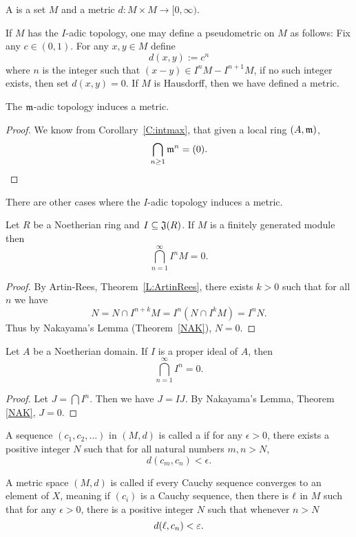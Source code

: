 \documentclass{ximera}
\begin{document}
\begin{definition}
  A  is a set $M$ and a metric $d:M\times M \to
  [0,\infty)$.
\end{definition}

If $M$ has the $I$-adic topology, one may define a
pseudometric on $M$ as follows: Fix any $c\in
(0,1)$. For any $x,y\in M$ define
\[
d(x,y) := c^n
\]
where $n$ is the integer such that $(x-y)\in I^nM-I^{n+1}M$, if no
such integer exists, then set $d(x,y) = 0$. If $M$ is
Hausdorff, then we have defined a metric.


\begin{corollary}
  The $\mathfrak{m}$-adic topology induces a metric.
  \begin{proof}
    We know from Corollary~\ref{C:intmax}, that given a local ring $(A,\mathfrak{m})$,
    \[
    \bigcap_{n\ge 1} \mathfrak{m}^n  = (0).
    \]
  \end{proof}
\end{corollary}

There are other cases where the $I$-adic topology induces a metric.

\begin{corollary}
  Let $R$ be a Noetherian ring and $I \subseteq \mathfrak J(R)$. If $M$ is a
  finitely generated module then
  \[
  \bigcap_{n=1}^\infty I^n M = 0.
  \]
  \begin{proof}
    By Artin-Rees, Theorem~\ref{L:ArtinRees}, there
    exists $k > 0$ such that for all $n$ we have
    \[
    N = N \cap I^{n + k}M = I^n(N \cap I^kM) = I^nN.
    \]
    Thus by Nakayama's Lemma
    (Theorem~\ref{NAK}), $N = 0$.
  \end{proof}
\end{corollary}


\begin{corollary}
  Let $A$ be a Noetherian domain. If $I$ is a proper ideal of $A$,
  then
  \[
  \bigcap_{n=1}^\infty I^n = 0.
  \]
  \begin{proof}
    Let $J = \bigcap I^n$.  Then we have $J = I J$.  By Nakayama's
    Lemma, Theorem \ref{NAK}, $J = 0$.
  \end{proof}
\end{corollary}









\begin{definition}
  A sequence $(c_1,c_2,\dots)$ in $(M,d)$ is called a  if for any $\epsilon>0$, there exists a positive integer
  $N$ such that for all natural numbers $m,n>N$,
  \[
  d(c_m,c_n) < \epsilon.
  \]
\end{definition}

\begin{definition}
  A metric space $(M,d)$ is called  if every Cauchy
  sequence converges to an element of $X$, meaning if $(c_i)$ is a
  Cauchy sequence, then there is $\ell$ in $M$ such that for any
  $\epsilon>0$, there is a positive integer $N$ such that whenever $n>N$
  \[
  d(\ell,c_n) < \varepsilon.
  \]
\end{definition}
\end{document}
